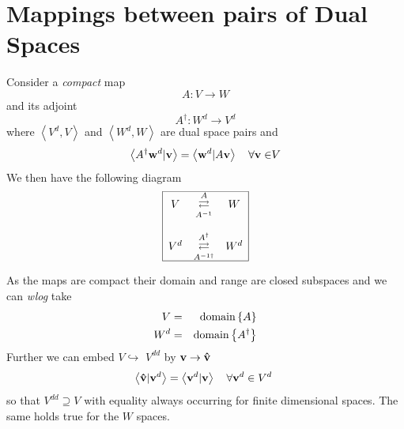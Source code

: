                       


\section{Mappings between pairs of Dual Spaces}

Consider a {\em compact} map 
\begin{equation}
A:V\longrightarrow W
\end{equation}%
and its adjoint  
\begin{equation}
A^{\dagger }:W^{d}\longrightarrow V^{d}
\end{equation}%
where $\left\langle V^{d},V\right\rangle $ and $\left\langle
W^{d},W\right\rangle $ are dual space pairs and 
\begin{equation}
\left\langle A^{\dagger }{\bf w}^{d}|{\bf v}\right\rangle =\left\langle {\bf %
w}^{d}|A{\bf v}\right\rangle \quad \forall {\bf v\in }V
\end{equation}%
We then have the following diagram 
\begin{equation}
\frame{$%
\begin{array}{ccc}
V & \stackrel{A}{%
\mathrel{\mathop{{\LARGE \rightleftarrows }}\limits_{A^{-1}}}%
} & W \\ 
&  &  \\ 
V^{d} & \stackrel{A^{\dagger }}{%
\mathrel{\mathop{{\LARGE \rightleftarrows }}\limits_{A^{-1\dagger }}}%
} & W^{d}%
\end{array}%
$}
\end{equation}%
As the maps are compact their domain and range are closed subspaces and we
can {\it wlog }take 
\begin{eqnarray}
V &=&%
\mathop{\rm domain}%
\left\{ A\right\}   \nonumber \\
W^{d} &=&%
\mathop{\rm domain}%
\left\{ A^{\dagger }\right\} 
\end{eqnarray}%
Further we can embed $V\hookrightarrow $ $V^{dd}$ by ${\bf v\rightarrow \hat{%
v}}$ 
\begin{equation}
\left\langle {\bf \hat{v}}|{\bf v}^{d}\right\rangle =\left\langle {\bf v}%
^{d}|{\bf v}\right\rangle \quad \forall {\bf v}^{d}\in V^{d}\text{ }
\end{equation}%
so that $V^{dd}\supseteq V$ with equality always occurring for finite
dimensional spaces. The same holds true for the $W$ spaces.

